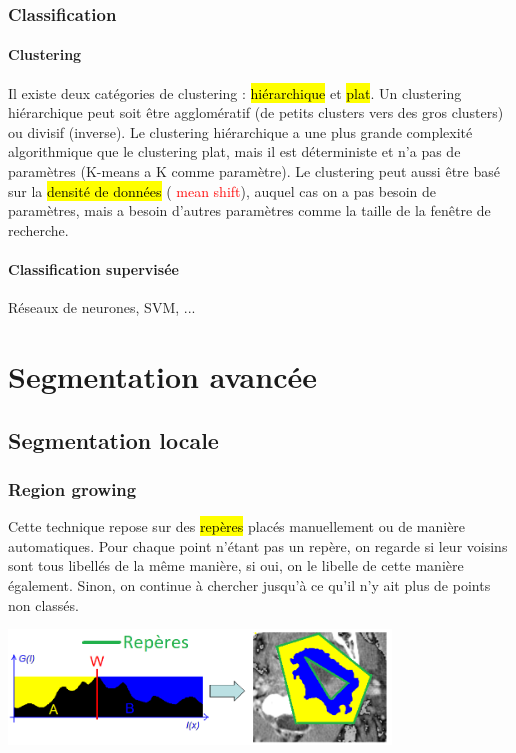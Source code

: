 \documentclass[letterpaper, 12pt]{article}
\newcommand{\alinea}{
\hspace*{0.5cm}}
\newcommand{\red}[1]{
	\textcolor{red}{#1}}
\begin{document}
		\subsubsection{Classification}
			\paragraph{Clustering}
				\alinea Il existe deux catégories de clustering :\hl{ hiérarchique} et \hl{plat}. Un clustering hiérarchique peut soit
					être agglomératif (de petits clusters vers des gros clusters) ou divisif (inverse). Le clustering hiérarchique
					a une plus grande complexité algorithmique que le clustering plat, mais il est déterministe et n'a pas de paramètres
					(K-means a K comme paramètre). Le clustering peut aussi être basé sur la \hl{densité de données} (\red{mean shift}),
					auquel cas on a pas besoin de paramètres, mais a besoin d'autres paramètres comme la taille de la fenêtre de 
					recherche. 
					
			\paragraph{Classification supervisée}
				\alinea Réseaux de neurones, SVM, ...
%
\section{Segmentation avancée}
	\subsection{Segmentation locale}
		\subsubsection{Region growing}
			\alinea Cette technique repose sur des \hl{repères} placés manuellement ou de manière automatiques. Pour chaque point
				n'étant pas un repère, on regarde si leur voisins sont tous libellés de la même manière, si oui, on le libelle
				de cette manière également. Sinon, on continue à chercher jusqu'à ce qu'il n'y ait plus de points non classés.
			\begin{center}
				\includegraphics[width=4in]{Images/region-growing}
			\end{center}
\end{document}
